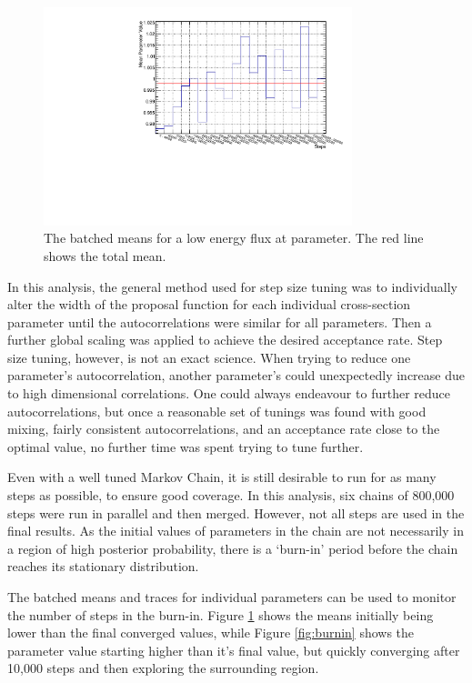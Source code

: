 \begin{figure}[!htbp]
\centering
\includegraphics*[width=0.8\textwidth,clip]{figs/batch}
\caption{The batched means for a low energy flux at parameter. The red line shows the total mean.}\label{fig:batch}
\end{figure}

In this analysis, the general method used for step size tuning was to individually alter the width of the proposal function for each individual cross-section parameter until the autocorrelations were similar for all parameters. Then a further global scaling was applied to achieve the desired acceptance rate. Step size tuning, however, is not an exact science. When trying to reduce one parameter's autocorrelation, another parameter's could unexpectedly increase due to high dimensional correlations. One could always endeavour to further reduce autocorrelations, but once a reasonable set of tunings was found with good mixing, fairly consistent autocorrelations, and an acceptance rate close to the optimal value, no further time was spent trying to tune further.

Even with a well tuned Markov Chain, it is still desirable to run for as many steps as possible, to ensure good coverage. In this analysis, six chains of 800,000 steps were run in parallel and then merged. However, not all steps are used in the final results. As the initial values of parameters in the chain are not necessarily in a region of high posterior probability, there is a `burn-in' period before the chain reaches its stationary distribution.

The batched means and traces for individual parameters can be used to monitor the number of steps in the burn-in. Figure \ref{fig:batch} shows the means initially being lower than the final converged values, while Figure \ref{fig:burnin} shows the parameter value starting higher than it's final value, but quickly converging after 10,000 steps and then exploring the surrounding region. 


